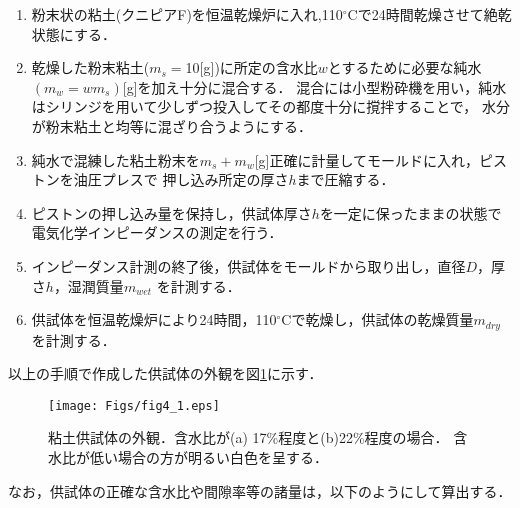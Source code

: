 \begin{enumerate}
\item
	粉末状の粘土(クニピアF)を恒温乾燥炉に入れ,110$^\circ$Cで24時間乾燥させて絶乾状態にする．
\item
	乾燥した粉末粘土($m_s=$10[g])に所定の含水比$w$とするために必要な純水$(m_w=w m_s)$[g]を加え十分に混合する．
	混合には小型粉砕機を用い，純水はシリンジを用いて少しずつ投入してその都度十分に撹拌することで，
	水分が粉末粘土と均等に混ざり合うようにする．
\item
	純水で混練した粘土粉末を$m_s+m_w$[g]正確に計量してモールドに入れ，ピストンを油圧プレスで
	押し込み所定の厚さ$h$まで圧縮する．
\item
	ピストンの押し込み量を保持し，供試体厚さ$h$を一定に保ったままの状態で電気化学インピーダンスの測定を行う．
\item
	インピーダンス計測の終了後，供試体をモールドから取り出し，直径$D$，厚さ$h$，湿潤質量$m_{wet}$
	を計測する．
\item
	供試体を恒温乾燥炉により24時間，110$^\circ$Cで乾燥し，供試体の乾燥質量$m_{dry}$を計測する．
\end{enumerate}
以上の手順で作成した供試体の外観を図\ref{fig:fig4_1}に示す．
\begin{figure}[h]
	\begin{center}
	\texttt{[image: Figs/fig4\_1.eps]} 
	\end{center}
	\caption{
		粘土供試体の外観．含水比が(a) 17\%程度と(b)22\%程度の場合．
		含水比が低い場合の方が明るい白色を呈する．
	} 
	\label{fig:fig4_1}
\end{figure}
なお，供試体の正確な含水比や間隙率等の諸量は，以下のようにして算出する．\\

